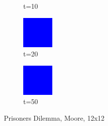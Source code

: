 \documentclass[a4paper, 11pt]{article}
\begin{document}
\begin{landscape}
\begin{figure}[H]
\begin{subfigure}{.26\textwidth}
  \caption{t=10}
\end{subfigure}%
\begin{subfigure}{.26\textwidth}
  \centering
  \includegraphics[width=0.9\linewidth]{PRISONERS_DILEMMA_MOORE_12x12_t20}
  \caption{t=20}
\end{subfigure}%
\begin{subfigure}{.26\textwidth}
  \centering
  \includegraphics[width=0.9\linewidth]{PRISONERS_DILEMMA_MOORE_12x12_t50}
  \caption{t=50}
\end{subfigure}
\caption{Prisoners Dilemma, Moore, 12x12}
\end{figure}

\end{landscape}
\end{document}
